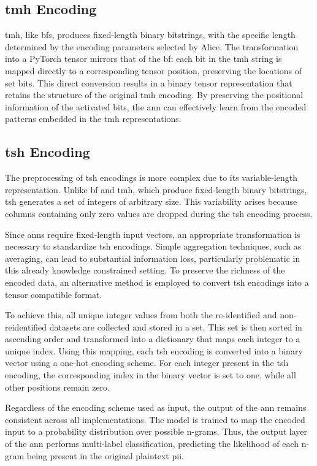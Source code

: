 \subsection{\ac{tmh} Encoding}

\ac{tmh}, like \acp{bf}, produces fixed-length binary bitstrings, with the specific length determined by the encoding parameters selected by Alice.
The transformation into a PyTorch tensor mirrors that of the \ac{bf}: each bit in the \ac{tmh} string is mapped directly to a corresponding tensor position, preserving the locations of set bits.
This direct conversion results in a binary tensor representation that retains the structure of the original \ac{tmh} encoding.
By preserving the positional information of the activated bits, the \ac{ann} can effectively learn from the encoded patterns embedded in the \ac{tmh} representations.

\subsection{\ac{tsh} Encoding}

The preprocessing of \ac{tsh} encodings is more complex due to its variable-length representation.
Unlike \ac{bf} and \ac{tmh}, which produce fixed-length binary bitstrings, \ac{tsh} generates a set of integers of arbitrary size.
This variability arises because columns containing only zero values are dropped during the \ac{tsh} encoding process.

Since \acp{ann} require fixed-length input vectors, an appropriate transformation is necessary to standardize \ac{tsh} encodings.
Simple aggregation techniques, such as averaging, can lead to substantial information loss, particularly problematic in this already knowledge constrained setting.
To preserve the richness of the encoded data, an alternative method is employed to convert \ac{tsh} encodings into a tensor compatible format.

To achieve this, all unique integer values from both the re-identified and non-reidentified datasets are collected and stored in a set.
This set is then sorted in ascending order and transformed into a dictionary that maps each integer to a unique index.
Using this mapping, each \ac{tsh} encoding is converted into a binary vector using a one-hot encoding scheme.
For each integer present in the \ac{tsh} encoding, the corresponding index in the binary vector is set to one, while all other positions remain zero.

Regardless of the encoding scheme used as input, the output of the \ac{ann} remains consistent across all implementations.
The model is trained to map the encoded input to a probability distribution over possible n-grams.
Thus, the output layer of the \ac{ann} performs multi-label classification, predicting the likelihood of each n-gram being present in the original plaintext \ac{pii}.

